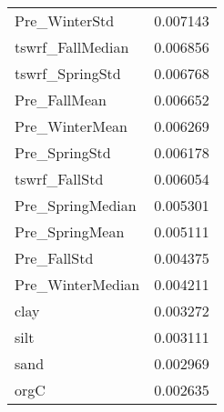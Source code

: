 \begin{tabular}{lr}
Pre_WinterStd & 0.007143 \\
tswrf_FallMedian & 0.006856 \\
tswrf_SpringStd & 0.006768 \\
Pre_FallMean & 0.006652 \\
Pre_WinterMean & 0.006269 \\
Pre_SpringStd & 0.006178 \\
tswrf_FallStd & 0.006054 \\
Pre_SpringMedian & 0.005301 \\
Pre_SpringMean & 0.005111 \\
Pre_FallStd & 0.004375 \\
Pre_WinterMedian & 0.004211 \\
clay & 0.003272 \\
silt & 0.003111 \\
sand & 0.002969 \\
orgC & 0.002635 \\
\bottomrule
\end{tabular}

